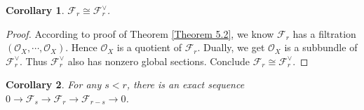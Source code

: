 \documentclass{ctexart}
\newtheorem{corollary}{Corollary}[section]
\begin{document}
\begin{corollary}
    $\mathcal{F}_{r} \cong \mathcal{F}_{r}^{\vee}$.
    \label{Corollary 5.6}
\end{corollary}
\begin{proof}
    According to proof of Theorem \ref{Theorem 5.2}, we know $\mathcal{F}_{r}$ has a filtration $(\mathcal{O}_{X}, \cdots, \mathcal{O}_{X})$.
    Hence $\mathcal{O}_{X}$ is a quotient of $\mathcal{F}_{r}$.
    Dually, we get $\mathcal{O}_{X}$ is a subbundle of $\mathcal{F}_{r}^{\vee}$.
    Thus $\mathcal{F}_{r}^{\vee}$ also has nonzero global sections.
    Conclude $\mathcal{F}_{r} \cong \mathcal{F}_{r}^{\vee}$. 
\end{proof}
\begin{corollary}
    For any $s < r$, there is an exact sequence $0 \rightarrow \mathcal{F}_{s} \rightarrow \mathcal{F}_{r} \rightarrow \mathcal{F}_{r - s} \rightarrow 0$.
    \label{Corollary 5.7}
\end{corollary}
\end{document}
